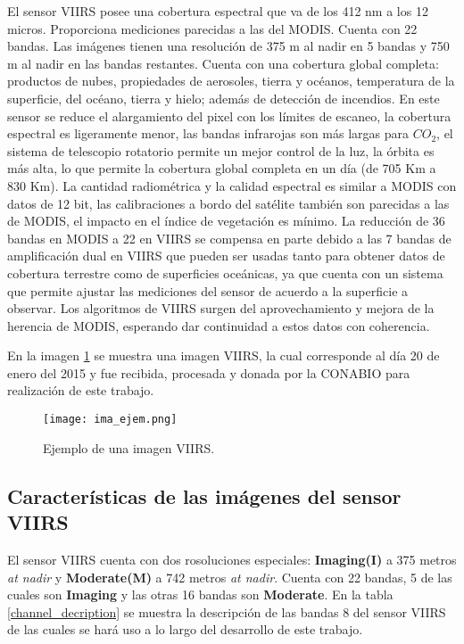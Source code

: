 El sensor VIIRS posee una cobertura espectral que va de los 412 nm a los 12 micros. Proporciona mediciones parecidas a las del MODIS. Cuenta con 22 bandas. Las imágenes tienen una resolución de 375 m al nadir en 5 bandas y 750 m al nadir en las bandas restantes. Cuenta con una cobertura global completa:  productos de nubes, propiedades de aerosoles, tierra y océanos, temperatura de la superficie, del océano, tierra y hielo; además de detección de incendios. En este sensor se reduce el alargamiento del pixel con los límites de escaneo, la cobertura espectral es ligeramente menor, las bandas infrarojas son más largas para $CO_{2}$, el sistema de telescopio rotatorio permite un mejor control de la luz, la órbita es más alta, lo que permite la cobertura global completa en un día (de 705 Km a 830 Km). La cantidad radiométrica y la calidad espectral es similar a MODIS con datos de 12 bit, las calibraciones a bordo del satélite también son parecidas a las de MODIS, el impacto en el índice de vegetación es mínimo. La reducción de 36 bandas en MODIS a 22 en VIIRS se compensa en parte debido a las 7 bandas de amplificación dual en VIIRS que pueden ser usadas tanto para obtener datos de cobertura terrestre  como de superficies oceánicas, ya que cuenta con un sistema que permite ajustar las mediciones del sensor de acuerdo a la superficie a observar. Los algoritmos de VIIRS surgen del aprovechamiento y mejora de la herencia de MODIS, esperando dar continuidad a estos datos con coherencia. 

En la imagen \ref{viirs_image} se muestra una imagen VIIRS, la cual corresponde al día 20 de enero del 2015 y fue recibida, procesada y donada por la CONABIO para realización de este trabajo. 

\begin{figure}

\centering
\texttt{[image: ima\_ejem.png]}
\caption{Ejemplo de una imagen VIIRS.}
\label{viirs_image}

\end{figure}


\subsection{Características de las imágenes del sensor VIIRS}

El sensor VIIRS cuenta con dos rosoluciones especiales: \textbf{Imaging(I)} a 375 metros \textit{at nadir} y \textbf{Moderate(M)} a 742 metros \textit{at nadir}. Cuenta con 22 bandas, 5 de las cuales son \textbf{Imaging} y las otras 16 bandas son \textbf{Moderate}.  En la tabla \ref{channel_decription} se muestra la descripción de las bandas 8 del sensor VIIRS de las cuales se hará  uso a lo largo del desarrollo de este trabajo. 

